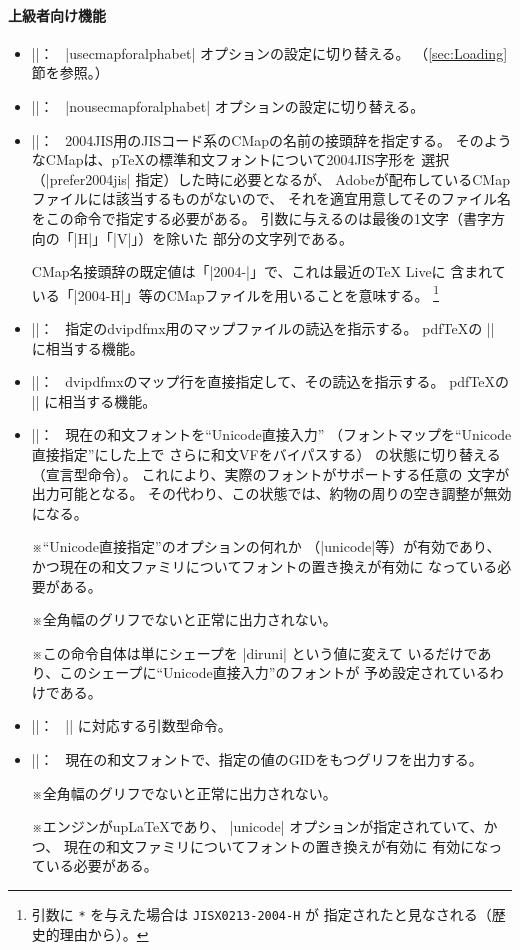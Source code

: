 \documentclass[uplatex,dvipdfmx,a4paper]{jsarticle}
\newcommand{\Meta}[1]{$\langle$\mbox{}#1\mbox{}$\rangle$}
\newcommand{\Note}{\par\noindent ※}
\newcommand{\Means}{：\ }
\providecommand{\pTeX}{p\TeX}
\providecommand{\pLaTeX}{p\LaTeX}
\providecommand{\upLaTeX}{u\pLaTeX}
\begin{document}
\paragraph{上級者向け機能}
\begin{itemize}
\item |\usecmapforalphabet|\Means
  |usecmapforalphabet| オプションの設定に切り替える。
  （\ref{sec:Loading}節を参照。）
\item |\nousecmapforalphabet|\Means
  |nousecmapforalphabet| オプションの設定に切り替える。
\item |\setnewglyphcmapprefix{|\Meta{文字列}|}|\Means
  2004JIS用のJISコード系のCMapの名前の接頭辞を指定する。
  そのようなCMapは、{\pTeX}の標準和文フォントについて2004JIS字形を
  選択（|prefer2004jis| 指定）した時に必要となるが、
  Adobeが配布しているCMapファイルには該当するものがないので、
  それを適宜用意してそのファイル名をこの命令で指定する必要がある。
  引数に与えるのは最後の1文字（書字方向の「|H|」「|V|」）を除いた
  部分の文字列である。\par
  CMap名接頭辞の既定値は「|2004-|」で、これは最近の{\TeX} Liveに
  含まれている「|2004-H|」等のCMapファイルを用いることを意味する。%
  \footnote{%
    引数に \texttt{*} を与えた場合は \texttt{JISX0213-2004-H} が
    指定されたと見なされる（歴史的理由から）。}
\item |\usefontmapfile{|\Meta{マップファイル名}|}|\Means
  指定のdvipdfmx用のマップファイルの読込を指示する。
  pdf{\TeX}の |\pdfmapfile| に相当する機能。
\item |\usefontmapline{|\Meta{マップ行}|}|\Means
  dvipdfmxのマップ行を直接指定して、その読込を指示する。
  pdf{\TeX}の |\pdfmapline| に相当する機能。
\item |\diruni|\Means
  現在の和文フォントを“Unicode直接入力”
  （フォントマップを“Unicode直接指定”にした上で
  さらに和文VFをバイパスする）
  の状態に切り替える（宣言型命令）。
  これにより、実際のフォントがサポートする任意の
  文字が出力可能となる。
  その代わり、この状態では、約物の周りの空き調整が無効になる。
  \Note “Unicode直接指定”のオプションの何れか
  （|unicode|等）が有効であり、
  かつ現在の和文ファミリについてフォントの置き換えが有効に
  なっている必要がある。
  \Note 全角幅のグリフでないと正常に出力されない。
  \Note この命令自体は単にシェープを |diruni| という値に変えて
  いるだけであり、このシェープに“Unicode直接入力”のフォントが
  予め設定されているわけである。
\item |\textdiruni{|\Meta{テキスト}|}|\Means
  |\diruni| に対応する引数型命令。
\item |\gid{|\Meta{整数}|}|\Means
  現在の和文フォントで、指定の値のGIDをもつグリフを出力する。
  \Note 全角幅のグリフでないと正常に出力されない。
  \Note エンジンが{\upLaTeX}であり、
  |unicode| オプションが指定されていて、かつ、
  現在の和文ファミリについてフォントの置き換えが有効に
  有効になっている必要がある。
\end{itemize}
\end{document}
